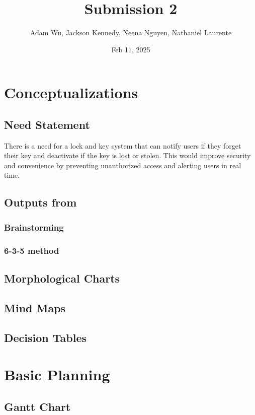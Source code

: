 \documentclass{article}
\title{Submission 2}
\author{Adam Wu, Jackson Kennedy, Neena Nguyen, Nathaniel Laurente}
\date{Feb 11, 2025}
\begin{document}
\maketitle

\tableofcontents

\section{Conceptualizations}
\subsection{Need Statement}

There is a need for a lock and key system that can notify users if they forget their key and deactivate if the key is lost or stolen. This would improve security and convenience by preventing unauthorized access and alerting users in real time.
\subsection{Outputs from}
\subsubsection{Brainstorming}

\subsubsection{6-3-5 method}

\subsection{Morphological Charts}

\subsection{Mind Maps}

\subsection{Decision Tables}

\section{Basic Planning}
\subsection{Gantt Chart}
\end{document}
